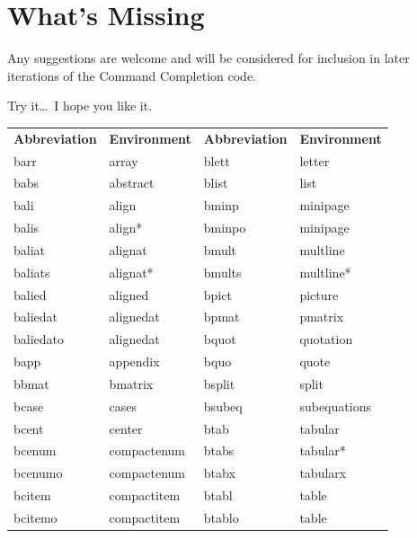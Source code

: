 \documentclass[11pt]{article}
\begin{document}
\section*{What's Missing}

Any suggestions are welcome and will be considered for inclusion in later iterations of the Command Completion code.

\vspace{5pt plus 2pt minus 1pt}\noindent
Try it\dots\ I hope you like it.


\begin{table}
\small
\centering
\begin{tabular}{llll}
\textbf{Abbreviation} & \textbf{Environment} & \textbf{Abbreviation} & \textbf{Environment} \\
\cmidrule[0.5pt](lr){1-1} \cmidrule[0.5pt](lr){2-2} \cmidrule[0.5pt](lr){3-3} \cmidrule[0.5pt](lr){4-4}
barr      & array       & blett   & letter \\
babs      & abstract    & blist   & list \\
bali      & align       & bminp   & minipage \\
balis     & align*      & bminpo  & minipage \\
baliat    & alignat     & bmult   & multline \\
baliats   & alignat*    & bmults  & multline* \\
balied    & aligned     & bpict   & picture \\
baliedat  & alignedat   & bpmat   & pmatrix \\
baliedato & alignedat   & bquot   & quotation \\
bapp      & appendix    & bquo    & quote \\
bbmat     & bmatrix     & bsplit  & split \\
bcase     & cases       & bsubeq  & subequations \\
bcent     & center      & btab    & tabular \\
bcenum    & compactenum & btabs   & tabular* \\
bcenumo   & compactenum & btabx   & tabularx \\
bcitem    & compactitem & btabl   & table \\
bcitemo   & compactitem & btablo  & table \\

\end{tabular}
\end{table}
\end{document}

